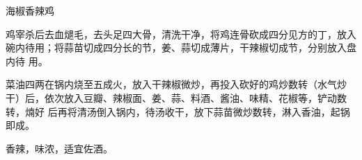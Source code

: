 %
%
%
%
%
%
%
\begin{recipe}[钢铁仔鸡]{海椒香辣鸡}

\ingredients


\preparation

\step 鸡宰杀后去血煺毛，去头足四大骨，清洗干净，将鸡连骨砍成四分见方的丁，放入
碗内待用；将蒜苗切成四分长的节，姜、蒜切成薄片，干辣椒切成节，分别放入盘内待
用。

\step 菜油四两在锅内烧至五成火，放入干辣椒微炒，再投入砍好的鸡炒数转（水气炒
干）后，依次放入豆瓣、辣椒面、姜、蒜、料酒、酱油、味精、花椒等，铲动数转，煵好
后再将清汤倒入锅内，待汤收干，放下蒜苗微炒数转，淋入香油，起锅即成。

\features

香辣，味浓，适宜佐酒。

\end{recipe}

